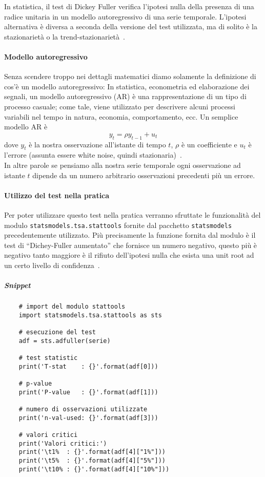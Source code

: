 In statistica, il test di Dickey Fuller verifica l'ipotesi nulla della presenza
di una radice unitaria in un modello autoregressivo di una serie temporale. 
L'ipotesi alternativa è diversa a seconda della versione del test utilizzata, 
ma di solito è la stazionarietà o la trend-stazionarietà~\cite{wiki:dickey_fuller}.

\paragraph{Modello autoregressivo}
Senza scendere troppo nei dettagli matematici diamo solamente la definizione di 
cos'è un modello autoregressivo: 
In statistica, econometria ed elaborazione dei segnali, 
un modello autoregressivo (AR) è una rappresentazione di 
un tipo di processo casuale; come tale, viene utilizzato 
per descrivere alcuni processi variabili nel tempo in natura, 
economia, comportamento, ecc.
Un semplice modello AR è
\[ y_t = \rho y_{t-1} + u_t \]
dove $y_t$ è la nostra osservazione all'istante di tempo $t$, $\rho$ è un coefficiente
e $u_t$ è l'errore (assunta essere white noise, quindi stazionaria)~\cite{wiki:dickey_fuller}.\\
In altre parole se pensiamo alla nostra serie temporale ogni osservazione ad istante $t$
dipende da un numero arbitrario osservazioni precedenti più un errore.

\paragraph{Utilizzo del test nella pratica}
Per poter utilizzare questo test nella pratica verranno sfruttate le 
funzionalità del modulo \texttt{statsmodels.tsa.stattools} fornite dal 
pacchetto \texttt{statsmodels} precedentemente utilizzato. Più
precisamente la funzione fornita dal modulo è il test di 
``Dichey-Fuller aumentato'' che fornisce un numero negativo, questo più 
è negativo tanto maggiore è il rifiuto dell'ipotesi nulla che esista una unit root
ad un certo livello di confidenza~\cite{wiki:aug_dickey_fuller}.

\subparagraph*{Snippet}
\begin{verbatim}
    # import del modulo stattools
    import statsmodels.tsa.stattools as sts

    # esecuzione del test
    adf = sts.adfuller(serie)

    # test statistic
    print('T-stat    : {}'.format(adf[0]))

    # p-value
    print('P-value   : {}'.format(adf[1]))

    # numero di osservazioni utilizzate
    print('n-val-used: {}'.format(adf[3]))

    # valori critici
    print('Valori critici:')
    print('\t1%  : {}'.format(adf[4]["1%"]))
    print('\t5%  : {}'.format(adf[4]["5%"]))
    print('\t10% : {}'.format(adf[4]["10%"]))
\end{verbatim}


